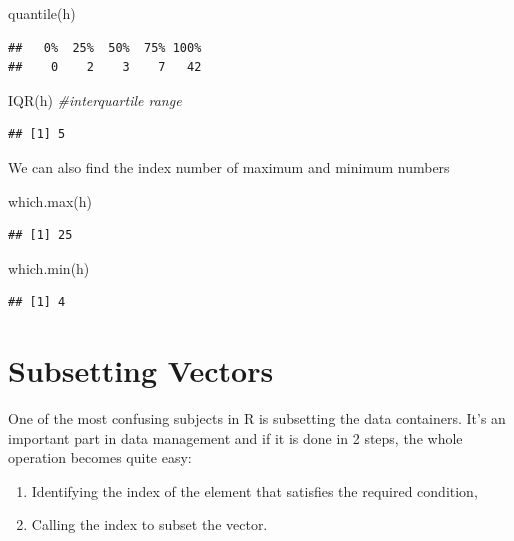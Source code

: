 \documentclass[
]{book}
\newenvironment{Shaded}{\begin{snugshade}}{\end{snugshade}}
\newcommand{\CommentTok}[1]{\textcolor[rgb]{0.56,0.35,0.01}{\textit{#1}}}
\newcommand{\FunctionTok}[1]{\textcolor[rgb]{0.00,0.00,0.00}{#1}}
\newcommand{\NormalTok}[1]{#1}
\providecommand{\tightlist}{%
  \setlength{\itemsep}{0pt}\setlength{\parskip}{0pt}}
\theoremstyle{definition}
\theoremstyle{definition}
\theoremstyle{definition}
\theoremstyle{definition}
\theoremstyle{remark}
\begin{document}
\begin{Shaded}
\begin{Highlighting}[]
\FunctionTok{quantile}\NormalTok{(h)}
\end{Highlighting}
\end{Shaded}

\begin{verbatim}
##   0%  25%  50%  75% 100% 
##    0    2    3    7   42
\end{verbatim}

\begin{Shaded}
\begin{Highlighting}[]
\FunctionTok{IQR}\NormalTok{(h) }\CommentTok{\#interquartile range}
\end{Highlighting}
\end{Shaded}

\begin{verbatim}
## [1] 5
\end{verbatim}

We can also find the index number of maximum and minimum numbers

\begin{Shaded}
\begin{Highlighting}[]
\FunctionTok{which.max}\NormalTok{(h)}
\end{Highlighting}
\end{Shaded}

\begin{verbatim}
## [1] 25
\end{verbatim}

\begin{Shaded}
\begin{Highlighting}[]
\FunctionTok{which.min}\NormalTok{(h)}
\end{Highlighting}
\end{Shaded}

\begin{verbatim}
## [1] 4
\end{verbatim}

\hypertarget{subsetting-vectors}{%
\section{Subsetting Vectors}\label{subsetting-vectors}}

One of the most confusing subjects in R is subsetting the data containers. It's an important part in data management and if it is done in 2 steps, the whole operation becomes quite easy:

\begin{enumerate}
\def\labelenumi{\arabic{enumi}.}
\tightlist
\item
  Identifying the index of the element that satisfies the required condition,
\item
  Calling the index to subset the vector.
\end{enumerate}
\end{document}

